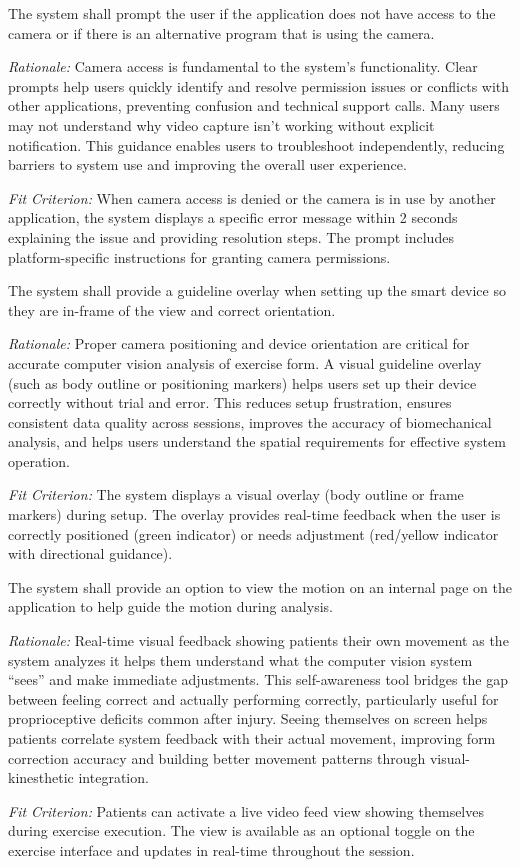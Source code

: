 \documentclass[12pt]{article}
\newcommand{\rationale}[1]{\par\emph{Rationale:} #1}
\newcommand{\fitcrit}[1]{\par\emph{Fit Criterion:} #1}
\begin{document}
\begin{reqlist}
	\item[UHR-EOU 4.] The system shall prompt the user if the application does not have access to the camera or if there is an alternative program that is using the camera.
	\rationale{Camera access is fundamental to the system's functionality. Clear prompts help users quickly identify and resolve permission issues or conflicts with other applications, preventing confusion and technical support calls. Many users may not understand why video capture isn't working without explicit notification. This guidance enables users to troubleshoot independently, reducing barriers to system use and improving the overall user experience.}
	\fitcrit{When camera access is denied or the camera is in use by another application, the system displays a specific error message within 2 seconds explaining the issue and providing resolution steps. The prompt includes platform-specific instructions for granting camera permissions.}
	
	\item[UHR-EOU 5.] The system shall provide a guideline overlay when setting up the smart device so they are in-frame of the view and correct orientation.
	\rationale{Proper camera positioning and device orientation are critical for accurate computer vision analysis of exercise form. A visual guideline overlay (such as body outline or positioning markers) helps users set up their device correctly without trial and error. This reduces setup frustration, ensures consistent data quality across sessions, improves the accuracy of biomechanical analysis, and helps users understand the spatial requirements for effective system operation.}
	\fitcrit{The system displays a visual overlay (body outline or frame markers) during setup. The overlay provides real-time feedback when the user is correctly positioned (green indicator) or needs adjustment (red/yellow indicator with directional guidance).}
	
	\item[UHR-EOU 6.] The system shall provide an option to view the motion on an internal page on the application to help guide the motion during analysis.
	\rationale{Real-time visual feedback showing patients their own movement as the system analyzes it helps them understand what the computer vision system ``sees'' and make immediate adjustments. This self-awareness tool bridges the gap between feeling correct and actually performing correctly, particularly useful for proprioceptive deficits common after injury. Seeing themselves on screen helps patients correlate system feedback with their actual movement, improving form correction accuracy and building better movement patterns through visual-kinesthetic integration.}
	\fitcrit{Patients can activate a live video feed view showing themselves during exercise execution. The view is available as an optional toggle on the exercise interface and updates in real-time throughout the session.}
\end{reqlist}
\end{document}
